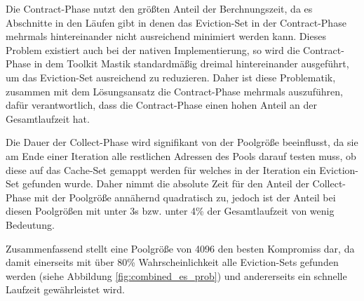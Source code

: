 Die Contract-Phase nutzt den größten Anteil der Berchnungszeit, da es Abschnitte in den Läufen gibt in denen das Eviction-Set in der Contract-Phase mehrmals hintereinander nicht ausreichend minimiert werden kann.
Dieses Problem existiert auch bei der nativen Implementierung, so wird die Contract-Phase in dem Toolkit Mastik standardmäßig dreimal hintereinander ausgeführt, um das Eviction-Set ausreichend zu reduzieren.
Daher ist diese Problematik, zusammen mit dem Lösungsansatz die Contract-Phase mehrmals auszuführen, dafür verantwortlich, dass die Contract-Phase einen hohen Anteil an der Gesamtlaufzeit hat.

Die Dauer der Collect-Phase wird signifikant von der Poolgröße beeinflusst, da sie am Ende einer Iteration alle restlichen Adressen des Pools darauf testen muss, ob diese auf das Cache-Set gemappt werden für welches in der Iteration ein Eviction-Set gefunden wurde.
Daher nimmt die absolute Zeit für den Anteil der Collect-Phase mit der Poolgröße annähernd quadratisch zu, jedoch ist der Anteil bei diesen Poolgrößen mit unter 3s bzw. unter 4\% der Gesamtlaufzeit von wenig Bedeutung.

Zusammenfassend stellt eine Poolgröße von 4096 den besten Kompromiss dar, da damit einerseits mit über 80\% Wahrscheinlichkeit alle Eviction-Sets gefunden werden (siehe Abbildung \ref{fig:combined_es_prob}) und andererseits ein schnelle Laufzeit gewährleistet wird.





